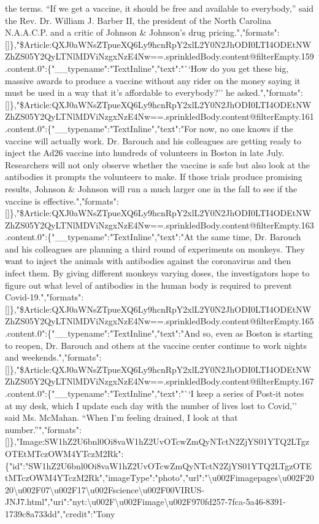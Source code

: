 the terms. ``If we get a vaccine, it should be free and available to
everybody,'' said the Rev. Dr. William J. Barber II, the president of
the North Carolina N.A.A.C.P. and a critic of Johnson \& Johnson's drug
pricing.","formats":{[}{]}\},"\$Article:QXJ0aWNsZTpueXQ6Ly9hcnRpY2xlL2Y0N2JhODI0LTI4ODEtNWZhZS05Y2QyLTNlMDViNzgxNzE4Nw==.sprinkledBody.content@filterEmpty.159.content.0":\{"\_\_typename":"TextInline","text":"``How
do you get these big, massive awards to produce a vaccine without any
rider on the money saying it must be used in a way that it's affordable
to everybody?'' he
asked.","formats":{[}{]}\},"\$Article:QXJ0aWNsZTpueXQ6Ly9hcnRpY2xlL2Y0N2JhODI0LTI4ODEtNWZhZS05Y2QyLTNlMDViNzgxNzE4Nw==.sprinkledBody.content@filterEmpty.161.content.0":\{"\_\_typename":"TextInline","text":"For
now, no one knows if the vaccine will actually work. Dr. Barouch and his
colleagues are getting ready to inject the Ad26 vaccine into hundreds of
volunteers in Boston in late July. Researchers will not only observe
whether the vaccine is safe but also look at the antibodies it prompts
the volunteers to make. If those trials produce promising results,
Johnson \& Johnson will run a much larger one in the fall to see if the
vaccine is
effective.","formats":{[}{]}\},"\$Article:QXJ0aWNsZTpueXQ6Ly9hcnRpY2xlL2Y0N2JhODI0LTI4ODEtNWZhZS05Y2QyLTNlMDViNzgxNzE4Nw==.sprinkledBody.content@filterEmpty.163.content.0":\{"\_\_typename":"TextInline","text":"At
the same time, Dr. Barouch and his colleagues are planning a third round
of experiments on monkeys. They want to inject the animals with
antibodies against the coronavirus and then infect them. By giving
different monkeys varying doses, the investigators hope to figure out
what level of antibodies in the human body is required to prevent
Covid-19.","formats":{[}{]}\},"\$Article:QXJ0aWNsZTpueXQ6Ly9hcnRpY2xlL2Y0N2JhODI0LTI4ODEtNWZhZS05Y2QyLTNlMDViNzgxNzE4Nw==.sprinkledBody.content@filterEmpty.165.content.0":\{"\_\_typename":"TextInline","text":"And
so, even as Boston is starting to reopen, Dr. Barouch and others at the
vaccine center continue to work nights and
weekends.","formats":{[}{]}\},"\$Article:QXJ0aWNsZTpueXQ6Ly9hcnRpY2xlL2Y0N2JhODI0LTI4ODEtNWZhZS05Y2QyLTNlMDViNzgxNzE4Nw==.sprinkledBody.content@filterEmpty.167.content.0":\{"\_\_typename":"TextInline","text":"``I
keep a series of Post-it notes at my desk, which I update each day with
the number of lives lost to Covid,'' said Ms. McMahan. ``When I'm
feeling drained, I look at that
number.''","formats":{[}{]}\},"Image:SW1hZ2U6bnl0Oi8vaW1hZ2UvOTcwZmQyNTctN2ZjYS01YTQ2LTgzOTEtMTczOWM4YTczM2Rk":\{"id":"SW1hZ2U6bnl0Oi8vaW1hZ2UvOTcwZmQyNTctN2ZjYS01YTQ2LTgzOTEtMTczOWM4YTczM2Rk","imageType":"photo","url":"\textbackslash{}u002Fimagepages\textbackslash{}u002F2020\textbackslash{}u002F07\textbackslash{}u002F17\textbackslash{}u002Fscience\textbackslash{}u002F00VIRUS-JNJ7.html","uri":"nyt:\textbackslash{}u002F\textbackslash{}u002Fimage\textbackslash{}u002F970fd257-7fca-5a46-8391-1739c8a733dd","credit":"Tony
